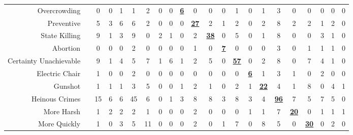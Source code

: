 \documentclass[11pt]{article}
\newcommand{\tnumb}[1]{\fontfamily{phv}\selectfont #1}%
\begin{document}
\begin{table}[]
{\begin{tabular}{r|c||c|cccccccccc|ccccccccc}
Overcrowding   &    \tnumb{8}   & 0 & 0 &    \cellcolor[HTML]{FFCE93}1   &    \cellcolor[HTML]{FFCE93}1   &    \cellcolor[HTML]{F8A102}2   & 0 & 0 &    {\ul\textbf{6}}   & 0 & 0 & 0 &    \cellcolor[HTML]{FFCE93}1   & 0 &    \cellcolor[HTML]{FFCE93}1   &    \cellcolor[HTML]{F8A102}3   & 0 & 0 & 0 & 0 &  0 \\
Preventive   &    \tnumb{9}   &    \cellcolor[HTML]{FFCE93}5   & 3 &    \cellcolor[HTML]{FFCE93}6   &    \cellcolor[HTML]{FFCE93}6   & 2 & 0 & 0 & 0 &    {\ul\textbf{27}}   & 2 & 1 & 2 & 0 & 2 &    \cellcolor[HTML]{FFCE93}8   & 2 & 2 & 1 & 2 &  0 \\
State Killing   &    \tnumb{10}   &    \cellcolor[HTML]{FFCE93}9   & 1 & 3 & 9 & 0 & 2 & 1 & 0 & 2 &    {\ul\textbf{38}}   & 0 & 5 & 0 & 1 &    \cellcolor[HTML]{FFCE93}8   & 0 & 0 & 3 & 1 &  0 \\
\midrule
Abortion   &    \tnumb{11}   & 0 & 0 & 0 &    \cellcolor[HTML]{FFCE93}2   & 0 & 0 & 0 & 0 & 1 & 0 &    {\ul\textbf{7}}   & 0 & 0 & 0 &    \cellcolor[HTML]{FFCE93}3   & 0 & 1 & 1 & 1 &  0 \\
Certainty Unachievable   &    \tnumb{12}   &    \cellcolor[HTML]{FFCE93}9   & 1 & 4 & 5 & 7 & 1 & 6 & 1 & 2 & 5 & 0 &    {\ul\textbf{57}}   & 0 & 2 & 8 & 0 & 7 & 4 & 1 &  0 \\
Electric Chair   &    \tnumb{13}   &    \cellcolor[HTML]{FFCE93}1   & 0 & 0 &    \cellcolor[HTML]{F8A102}2   & 0 & 0 & 0 & 0 & 0 & 0 & 0 & 0 &    {\ul\textbf{6}}   &    \cellcolor[HTML]{FFCE93}1   &    \cellcolor[HTML]{F8A102}3   &    \cellcolor[HTML]{FFCE93}1   & 0 &    \cellcolor[HTML]{F8A102}2   & 0 &  0 \\
Gunshot   &    \tnumb{14}   & 1 & 1 & 1 & 3 &    \cellcolor[HTML]{FFCE93}5   & 0 & 0 & 1 & 2 & 1 & 0 & 2 & 1 &    {\ul\textbf{22}}   &    \cellcolor[HTML]{FFCE93}4   & 1 &    \cellcolor[HTML]{F8A102}8   & 0 &    \cellcolor[HTML]{FFCE93}4   &  1 \\
Heinous Crimes   &    \tnumb{15}   &    \cellcolor[HTML]{FFCE93}15   & 6 & 6 &    \cellcolor[HTML]{F8A102} 45   & 6 & 0 & 1 & 3 & 8 & 8 & 3 & 8 & 3 & 4 &    {\ul\textbf{96}}   & 7 & 5 & 7 & 5 &  0 \\
More Harsh   &    \tnumb{16}   & 1 & 2 & 2 & 2 & 1 & 0 & 0 & 0 & 2 & 0 & 0 & 0 & 1 & 1 &    \cellcolor[HTML]{FFCE93}7   &    {\ul\textbf{20}}   & 0 & 1 & 1 &  1 \\
More Quickly   &    \tnumb{17}   & 1 & 0 & 3 &    \cellcolor[HTML]{FFCE93}5   &    \cellcolor[HTML]{F8A102}11   & 0 & 0 & 0 & 2 & 0 & 1 &    \cellcolor[HTML]{FFCE93}7   & 0 &    \cellcolor[HTML]{FFCE93}8   &    \cellcolor[HTML]{FFCE93}5   & 0 &    {\ul\textbf{30}}   & 0 & 2 &  0 \\

\end{tabular}}
\end{table}
\end{document}
